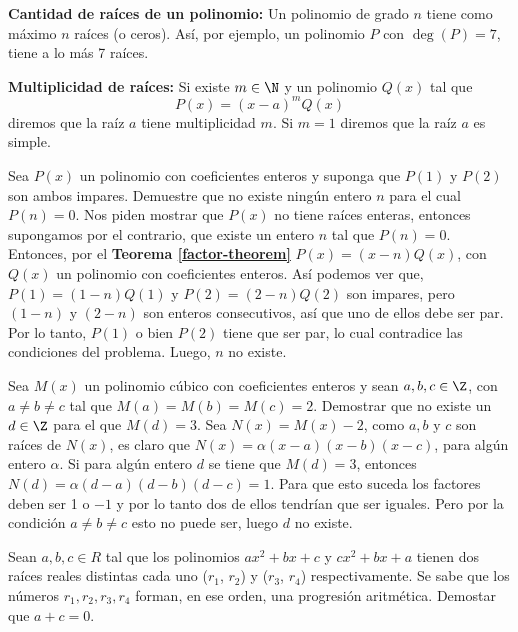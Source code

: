 {    \textbf{Cantidad de raíces de un polinomio:} Un polinomio de grado $n$ tiene como máximo $n$ raíces (o ceros). Así, por ejemplo, un polinomio $P$ con $\deg{(P)} = 7$, tiene a lo más 7 raíces.

    \textbf{Multiplicidad de raíces:} Si existe $m \in \N$ y un polinomio $Q(x)$ tal que \[P(x) = (x - a)^m Q(x)\] diremos que la raíz $a$ tiene multiplicidad $m$. Si $m = 1$ diremos que la raíz $a$ es simple.

    \begin{example}
        Sea $P(x)$ un polinomio con coeficientes enteros y suponga que $P(1)$ y $P(2)$ son ambos impares. Demuestre que no existe ningún entero $n$ para el cual $P(n) = 0$.
        \solution
        {
            Nos piden mostrar que $P(x)$ no tiene raíces enteras, entonces supongamos por el contrario, que existe un entero $n$ tal que $P(n) = 0$. Entonces, por el \textbf{Teorema \ref{factor-theorem}} $P(x) = (x - n)Q(x)$, con $Q(x)$ un polinomio con coeficientes enteros. Así podemos ver que, $P(1) = (1 - n)Q(1)$ y $P(2) = (2 - n)Q(2)$ son impares, pero $(1 - n)$ y $(2 - n)$ son enteros consecutivos, así que uno de ellos debe ser par. Por lo tanto, $P(1)$ o bien $P(2)$ tiene que ser par, lo cual contradice las condiciones del problema. Luego, $n$ no existe.
        }
    \end{example}

    \begin{example}
        Sea $M(x)$ un polinomio cúbico con coeficientes enteros y sean $a, b, c \in \Z$, con $a \neq b \neq c$ tal que $M(a) = M(b) = M(c) = 2$. Demostrar que no existe un $d \in \Z$ para el que $M(d) = 3.$
        \solution
        {
            Sea $N(x) = M(x) - 2$, como $a, b \mbox{ y } c$ son raíces de $N(x)$, es claro que $N(x) = \alpha (x - a)(x - b)(x - c)$, para algún entero $\alpha$. Si para algún entero $d$ se tiene que $M(d) = 3$, entonces $N(d) = \alpha (d - a)(d - b)(d - c) = 1$. Para que esto suceda los factores deben ser 1 o $-1$ y por lo tanto dos de ellos tendrían que ser iguales. Pero por la condición $a \neq b \neq c$ esto no puede ser, luego $d$ no existe.
        }
    \end{example}
}
        Sean $a, b, c \in R$ tal que los polinomios $ax^2 + bx + c$ y $cx^2 + bx + a$
        tienen dos raíces reales distintas cada uno ($r_1$, $r_2$) y ($r_3$, $r_4$) respectivamente.
        Se sabe que los números $r_1, r_2, r_3, r_4$ forman, en ese orden, una progresión aritmética.
        Demostar que $a + c = 0.$
\label{subsec:definiciones}

